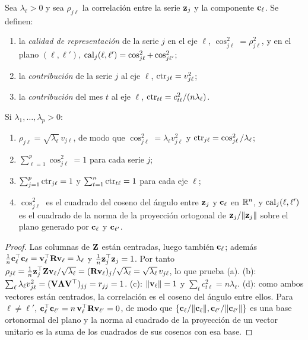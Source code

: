 \begin{definicion}\label{def:cos2}
Sea $\lambda_\ell>0$ y sea $\rho_{j\ell}$ la correlación entre la serie $\mathbf{z}_j$ y la componente
$\mathbf{c}_\ell$. Se definen:
\begin{enumerate}[label=(\alph*)]
  \item la \emph{calidad de representación} de la serie $j$ en el eje $\ell$,
    $\cos^2_{j\ell}=\rho_{j\ell}^2$, y en el plano $(\ell,\ell')$,
    $\operatorname{cal}_j(\ell,\ell')=\cos^2_{j\ell}+\cos^2_{j\ell'}$;
  \item la \emph{contribución} de la serie $j$ al eje $\ell$, $\operatorname{ctr}_{j\ell}=v_{j\ell}^2$;
  \item la \emph{contribución} del mes $t$ al eje $\ell$, $\operatorname{ctr}_{t\ell}=c_{t\ell}^2/(n\lambda_\ell)$.
\end{enumerate}
\end{definicion}

\begin{proposicion}\label{prop:cos2}
Si $\lambda_1,\dots,\lambda_p>0$:
\begin{enumerate}[label=(\alph*)]
  \item $\rho_{j\ell}=\sqrt{\lambda_\ell}\,v_{j\ell}$, de modo que $\cos^2_{j\ell}=\lambda_\ell
    v_{j\ell}^2$ y $\operatorname{ctr}_{j\ell}=\cos^2_{j\ell}/\lambda_\ell$;
  \item $\sum_{\ell=1}^{p}\cos^2_{j\ell}=1$ para cada serie $j$;
  \item $\sum_{j=1}^{p}\operatorname{ctr}_{j\ell}=1$ y $\sum_{t=1}^{n}\operatorname{ctr}_{t\ell}=1$ para cada eje $\ell$;
  \item $\cos^2_{j\ell}$ es el cuadrado del coseno del ángulo entre $\mathbf{z}_j$ y $\mathbf{c}_\ell$ en
    $\mathbb{R}^n$, y $\operatorname{cal}_j(\ell,\ell')$ es el cuadrado de la norma de la proyección ortogonal de
    $\mathbf{z}_j/\lVert \mathbf{z}_j\rVert$ sobre el plano generado por $\mathbf{c}_\ell$ y $\mathbf{c}_{\ell'}$.
\end{enumerate}
\end{proposicion}

\begin{proof}
Las columnas de $\mathbf{Z}$ están centradas, luego también $\mathbf{c}_\ell$; además
$\frac1n\mathbf{c}_\ell^{\top}\mathbf{c}_\ell=\mathbf{v}_\ell^{\top}\mathbf{R}\mathbf{v}_\ell=\lambda_\ell$ y
$\frac1n\mathbf{z}_j^{\top}\mathbf{z}_j=1$. Por tanto
$\rho_{j\ell}=\frac1n\mathbf{z}_j^{\top}\mathbf{Z}\mathbf{v}_\ell/\sqrt{\lambda_\ell}=(\mathbf{R}\mathbf{v}_\ell)_j/\sqrt{\lambda_\ell}
=\sqrt{\lambda_\ell}\,v_{j\ell}$, lo que prueba (a). (b): $\sum_\ell\lambda_\ell v_{j\ell}^2=
(\mathbf{V}\boldsymbol{\Lambda}\mathbf{V}^{\top})_{jj}=r_{jj}=1$. (c): $\lVert \mathbf{v}_\ell\rVert=1$ y
$\sum_t c_{t\ell}^2=n\lambda_\ell$. (d): como ambos vectores están centrados, la correlación es
el coseno del ángulo entre ellos. Para $\ell\ne\ell'$,
$\mathbf{c}_\ell^{\top}\mathbf{c}_{\ell'}=n\,\mathbf{v}_\ell^{\top}\mathbf{R}\mathbf{v}_{\ell'}=0$, de modo que
$\{\mathbf{c}_\ell/\lVert \mathbf{c}_\ell\rVert,\mathbf{c}_{\ell'}/\lVert \mathbf{c}_{\ell'}\rVert\}$ es una base ortonormal del plano y la
norma al cuadrado de la proyección de un vector unitario es la suma de los cuadrados de sus
cosenos con esa base.
\end{proof}

